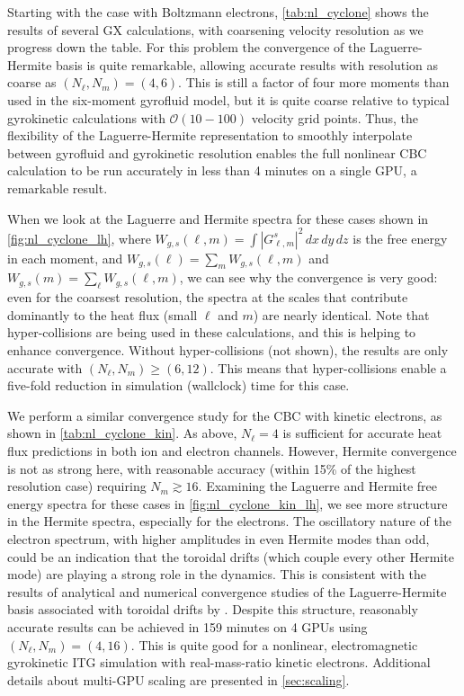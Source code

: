 \documentclass{jpp}
\newcommand{\GX}{{GX}\xspace}
\begin{document}
Starting with the case with Boltzmann electrons, \cref{tab:nl_cyclone} shows the results of several \GX calculations, with coarsening velocity resolution as we progress down the table. For this problem the convergence of the Laguerre-Hermite basis is quite remarkable, allowing accurate results with resolution as coarse as $( N_\ell, N_m) = (4,6)$. This is still a factor of four more moments than used in the \citet{Beer1996} six-moment gyrofluid model, but it is quite coarse relative to typical gyrokinetic calculations {\color{black} with $\mathcal{O}(10-100)$ velocity grid points}. Thus, the flexibility of the Laguerre-Hermite representation to smoothly interpolate between gyrofluid and gyrokinetic resolution enables the full nonlinear CBC calculation to be run accurately in less than 4 minutes on a single GPU, a remarkable result.


When we look at the Laguerre and Hermite spectra for these cases shown in \cref{fig:nl_cyclone_lh}, where $W_{g,s}(\ell,m) = \int |G_{\ell,m}^s|^2\, dx\, dy\, dz$ is the free energy in each moment, {\color{black} and $W_{g,s}(\ell) = \sum_m W_{g,s}(\ell, m)$ and $W_{g,s}(m) = \sum_\ell W_{g,s}(\ell, m)$}, we can see why the convergence is very good: even for the coarsest resolution, the spectra at the scales that contribute dominantly to the heat flux (small $\ell$ and $m$) are nearly identical. Note that hyper-collisions are being used in these calculations, and this is helping to enhance convergence. Without hyper-collisions (not shown), the results are only accurate with $( N_\ell, N_m) \geq (6,12)$. This means that hyper-collisions enable a five-fold reduction in simulation (wallclock) time for this case.

We perform a similar convergence study for the CBC with kinetic electrons, as shown in \cref{tab:nl_cyclone_kin}. As above, $ N_\ell=4$ is sufficient for accurate heat flux predictions in both ion and electron channels. However, Hermite convergence is not as strong here, with reasonable accuracy {\color{black} (within 15\% of the highest resolution case)}  requiring $ N_m\gtrsim 16$. Examining the Laguerre and Hermite free energy spectra for these cases in \cref{fig:nl_cyclone_kin_lh}, we see more structure in the Hermite spectra, especially for the electrons. The oscillatory nature of the {\color{black} electron} spectrum, with higher amplitudes in even Hermite modes than odd, could be an indication that the toroidal drifts (which couple every other Hermite mode) are playing a strong role in the dynamics. {\color{black} This is consistent with the results of analytical and numerical convergence studies of the Laguerre-Hermite basis associated with toroidal drifts by \citet{Frei2022a,Frei2023}.}
Despite this structure, reasonably accurate results can be achieved in 159 minutes on 4 GPUs using $( N_\ell, N_m)=(4,16)$. This is quite good for a nonlinear, electromagnetic gyrokinetic ITG simulation with real-mass-ratio kinetic electrons. Additional details about multi-GPU scaling are presented in \cref{sec:scaling}.
\end{document}
